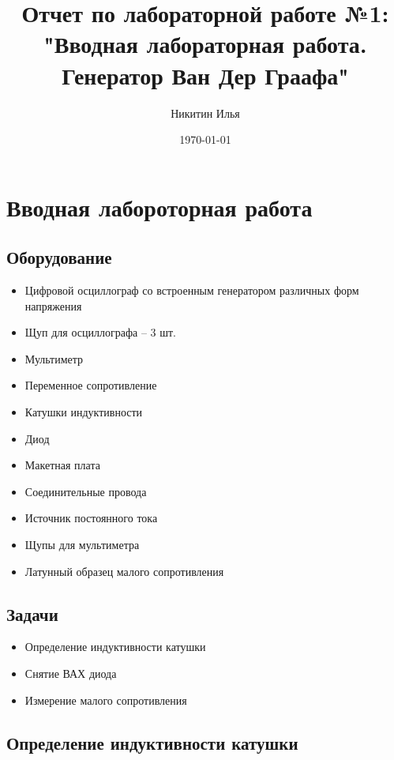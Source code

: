 \documentclass[a4paper,14pt]{extarticle}
\author{Никитин Илья}
\title{Отчет по лабораторной работе №1: "Вводная лабораторная работа. Генератор Ван Дер Граафа"}
\date{\today}
\begin{document}
	
	\maketitle
	\tableofcontents
	
	\section{Вводная лабороторная работа}
		\subsection{Оборудование}
			\begin{itemize}
				\item Цифровой осциллограф со встроенным генератором различных
				форм напряжения
				\item Щуп для осциллографа – 3 шт.
				\item Мультиметр
				\item Переменное сопротивление 
				\item Катушки индуктивности 
				\item Диод 
				\item Макетная плата 
				\item Соединительные провода 
				\item Источник постоянного тока 
				\item Щупы для мультиметра 
				\item Латунный образец малого сопротивления
			\end{itemize}
		\subsection{Задачи}
			\begin{itemize}
				\item Определение индуктивности катушки
				\item Снятие ВАХ диода
				\item Измерение малого сопротивления
			\end{itemize}
		\subsection{Определение индуктивности катушки}
\end{document}
